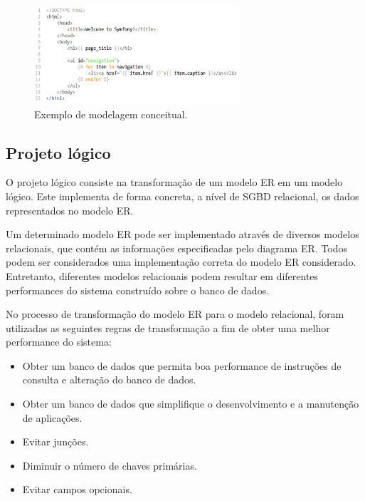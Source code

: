 \documentclass[cic,tc]{iiufrgs}
\begin{document}
\begin{figure}[h]
    \caption{Exemplo de modelagem conceitual.}
        \begin{center}
            \includegraphics[width=0.68\textwidth]{figuras/twig-symf.png}
        \end{center}
    \label{modelagemBDExemplol}
\end{figure}

\subsection{Projeto lógico}
\label{BDProjeto}

O projeto lógico consiste na transformação de um modelo ER em um modelo lógico. Este implementa de forma concreta, a nível de SGBD relacional, os dados representados no modelo ER.

Um determinado modelo ER pode ser implementado através de diversos modelos relacionais, que contém as informações especificadas pelo diagrama ER. Todos podem ser considerados uma implementação correta do modelo ER considerado. Entretanto, diferentes modelos relacionais podem resultar em diferentes performances do sistema construído sobre o banco de dados. 

No processo de transformação do modelo ER para o modelo relacional, foram utilizadas as seguintes regras de transformação \cite{heuser} a fim de obter uma melhor performance do sistema: 

\begin{itemize}
    \item Obter um banco de dados que permita boa performance de instruções de consulta e alteração do banco de dados.
    
    \item Obter um banco de dados que simplifique o desenvolvimento e a manutenção de aplicações.
    
    \item Evitar junções.
    
    \item Diminuir o número de chaves primárias.
    
    \item Evitar campos opcionais.
    
\end{itemize}
\end{document}
